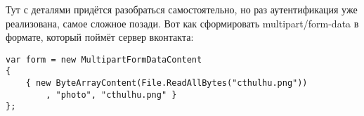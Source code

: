 \documentclass{../../text-style}
\begin{document}
Тут с деталями придётся разобраться самостоятельно, но раз аутентификация уже реализована, самое сложное позади. Вот как сформировать multipart/form-data в формате, который поймёт сервер вконтакта:

\begin{verbatim}
var form = new MultipartFormDataContent
{
    { new ByteArrayContent(File.ReadAllBytes("cthulhu.png"))
        , "photo", "cthulhu.png" }
};
\end{verbatim}
\end{document}
